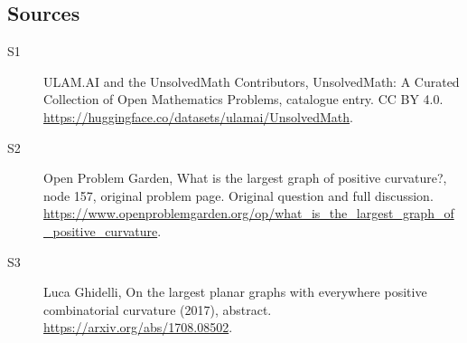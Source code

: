 \documentclass[11pt]{article}
\begin{document}
\subsection{Sources}
\begin{description}
\item[\hypertarget{source:statement:1}{S1}] ULAM.AI and the UnsolvedMath Contributors, UnsolvedMath: A Curated Collection of Open Mathematics Problems, catalogue entry. CC BY 4.0. \url{https://huggingface.co/datasets/ulamai/UnsolvedMath}.
\item[\hypertarget{source:statement:2}{S2}] Open Problem Garden, What is the largest graph of positive curvature?, node 157, original problem page. Original question and full discussion. \url{https://www.openproblemgarden.org/op/what_is_the_largest_graph_of_positive_curvature}.
\item[\hypertarget{source:statement:3}{S3}] Luca Ghidelli, On the largest planar graphs with everywhere positive combinatorial curvature (2017), abstract. \url{https://arxiv.org/abs/1708.08502}.
\end{description}
\label{end:statement}
\end{document}
